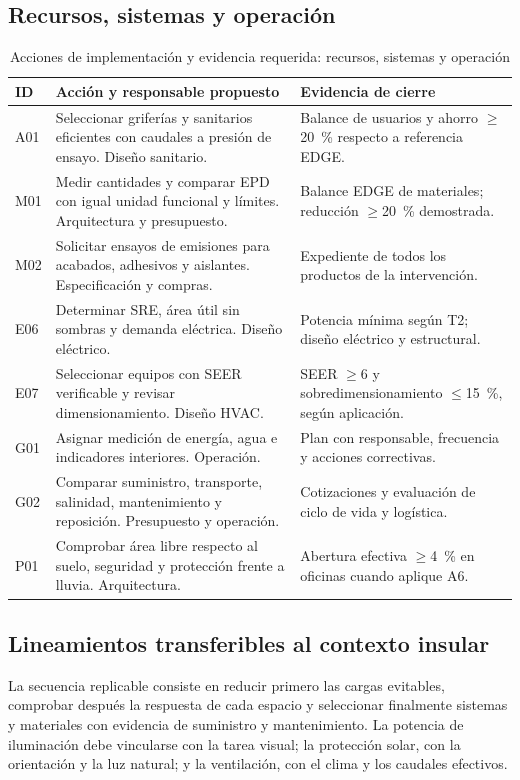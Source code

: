 \subsection{Recursos, sistemas y operación}
\begin{table}[H]\centering
\caption{Acciones de implementación y evidencia requerida: recursos, sistemas y operación}
{\fontsize{9}{11}\selectfont\singlespacing\renewcommand{\arraystretch}{1.3}
\begin{tabular}{>{\raggedright\arraybackslash}p{1.1cm}>{\raggedright\arraybackslash}p{6.1cm}>{\raggedright\arraybackslash}p{6.1cm}}\toprule
ID & Acción y responsable propuesto & Evidencia de cierre \\ \midrule
A01 & Seleccionar griferías y sanitarios eficientes con caudales a presión de ensayo. Diseño sanitario. & Balance de usuarios y ahorro $\geq$20 \,\% respecto a referencia EDGE. \\
M01 & Medir cantidades y comparar EPD con igual unidad funcional y límites. Arquitectura y presupuesto. & Balance EDGE de materiales; reducción $\geq$20 \,\% demostrada. \\
M02 & Solicitar ensayos de emisiones para acabados, adhesivos y aislantes. Especificación y compras. & Expediente de todos los productos de la intervención. \\
E06 & Determinar SRE, área útil sin sombras y demanda eléctrica. Diseño eléctrico. & Potencia mínima según T2; diseño eléctrico y estructural. \\
E07 & Seleccionar equipos con SEER verificable y revisar dimensionamiento. Diseño HVAC. & SEER $\geq$6 y sobredimensionamiento $\leq$15 \,\%, según aplicación. \\
G01 & Asignar medición de energía, agua e indicadores interiores. Operación. & Plan con responsable, frecuencia y acciones correctivas. \\
G02 & Comparar suministro, transporte, salinidad, mantenimiento y reposición. Presupuesto y operación. & Cotizaciones y evaluación de ciclo de vida y logística. \\
P01 & Comprobar área libre respecto al suelo, seguridad y protección frente a lluvia. Arquitectura. & Abertura efectiva $\geq$4 \,\% en oficinas cuando aplique A6. \\
\bottomrule\end{tabular}}
\end{table}
\par\medskip
\subsection{Lineamientos transferibles al contexto insular}
La secuencia replicable consiste en reducir primero las cargas evitables, comprobar después la respuesta de cada espacio y seleccionar finalmente sistemas y materiales con evidencia de suministro y mantenimiento. La potencia de iluminación debe vincularse con la tarea visual; la protección solar, con la orientación y la luz natural; y la ventilación, con el clima y los caudales efectivos.

